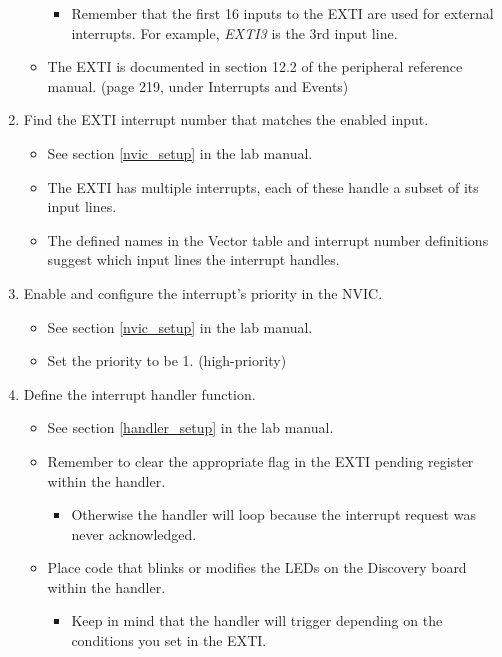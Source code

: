 \documentclass[11pt,fleqn]{book} %
\begin{document}
\begin{enumerate}
\begin{itemize}
        \begin{itemize}
            \item Remember that the first 16 inputs to the EXTI are used for external interrupts. For example, \textit{EXTI3} is the 3rd input line. 
        \end{itemize}
        \item The EXTI is documented in section 12.2 of the peripheral reference manual. (page 219, under Interrupts and Events)
    \end{itemize}
    \item Find the EXTI interrupt number that matches the enabled input.
    \begin{itemize}
        \item  See section \ref{nvic_setup} in the lab manual.
        \item The EXTI has multiple interrupts, each of these handle a subset of its input lines.
        \item  The defined names in the Vector table and interrupt number definitions suggest which input lines the interrupt handles.
    \end{itemize}
    \item Enable and configure the interrupt's priority in the NVIC.
    \begin{itemize}
        \item See section \ref{nvic_setup} in the lab manual.
        \item Set the priority to be 1. (high-priority)
    \end{itemize}
    \item Define the interrupt handler function.
    \begin{itemize}
        \item See section \ref{handler_setup} in the lab manual.
        \item Remember to clear the appropriate flag in the EXTI pending register within the handler.
        \begin{itemize}
            \item  Otherwise the handler will loop because the interrupt request was never acknowledged.
        \end{itemize}
        \item Place code that blinks or modifies the LEDs on the Discovery board within the handler.
        \begin{itemize}
            \item Keep in mind that the handler will trigger depending on the conditions you set in the EXTI. 
        \end{itemize}
    \end{itemize}
\end{enumerate}
\end{document}
